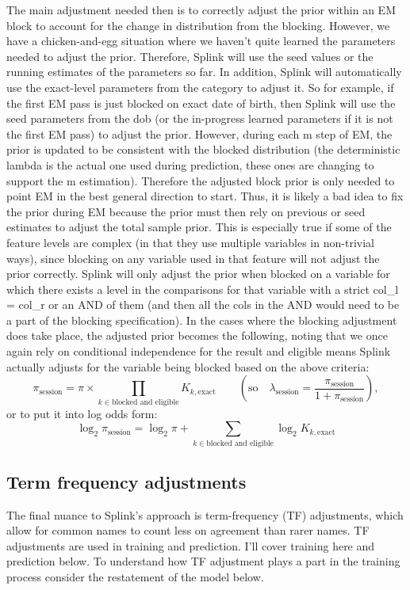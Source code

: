 \documentclass[11pt]{article}
\begin{document}
The main adjustment needed then is to correctly adjust the prior within an EM block to account for the change in distribution from the blocking. However, we have a chicken-and-egg situation where we haven't quite learned the parameters needed to adjust the prior. Therefore, Splink will use the seed values or the running estimates of the parameters so far. In addition, Splink will automatically use the exact-level parameters from the category to adjust it. So for example, if the first EM pass is just blocked on exact date of birth, then Splink will use the seed parameters from the dob (or the in-progress learned parameters if it is not the first EM pass) to adjust the prior. However, during each m step of EM, the prior is updated to be consistent with the blocked distribution (the deterministic lambda is the actual one used during prediction, these ones are changing to support the m estimation). Therefore the adjusted block prior is only needed to point EM in the best general direction to start. Thus, it is likely a bad idea to fix the prior during EM because the prior must then rely on previous or seed estimates to adjust the total sample prior. This is especially true if some of the feature levels are complex (in that they use multiple variables in non-trivial ways), since blocking on any variable used in that feature will not adjust the prior correctly. Splink will only adjust the prior when blocked on a variable for which there exists a level in the comparisons for that variable with a strict col\_l = col\_r or an AND of them (and then all the cols in the AND would need to be a part of the blocking specification). In the cases where the blocking adjustment does take place, the adjusted prior becomes the following, noting that we once again rely on conditional independence for the result and eligible means Splink actually adjusts for the variable being blocked based on the above criteria:
\[
\pi_{\text{session}} = \pi \times \prod_{k \in \text{blocked and eligible}} K_{k,\text{exact}} \qquad \left(\text{so} \quad \lambda_{\text{session}} = \frac{\pi_{\text{session}}}{1 + \pi_{\text{session}}}\right),
\]
or to put it into log odds form:
\[
\log_2 \pi_{\text{session}} = \log_2 \pi + \sum_{k \in \text{blocked and eligible}} \log_2 K_{k,\text{exact}}
\]

\subsection{Term frequency adjustments}

The final nuance to Splink's approach is term-frequency (TF) adjustments, which allow for common names to count less on agreement than rarer names. TF adjustments are used in training and prediction. I'll cover training here and prediction below. To understand how TF adjustment plays a part in the training process consider the restatement of the model below.
\end{document}
